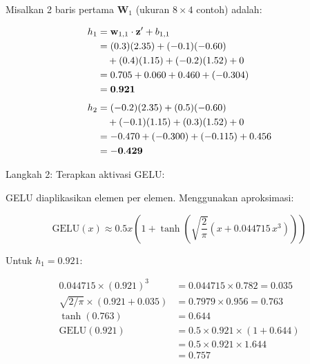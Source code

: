 \vspace{0.5cm}
\noindent
Misalkan 2 baris pertama $\mathbf{W}_1$ (ukuran $8\times4$ contoh) adalah:
 
\vspace{0.5cm}
\begin{align*}
  h_1
  &= \mathbf{w}_{1,1} \cdot \mathbf{z}' + b_{1,1} \notag \\
  &= (0.3)(2.35) + (-0.1)(-0.60) \notag \\
  &\quad + (0.4)(1.15) + (-0.2)(1.52) + 0 \notag \\
  &= 0.705 + 0.060 + 0.460 + (-0.304) \notag \\
  &= \mathbf{0.921} \\[4pt]
  h_2
  &= (-0.2)(2.35) + (0.5)(-0.60) \notag \\
  &\quad + (-0.1)(1.15) + (0.3)(1.52) + 0 \notag \\
  &= -0.470 + (-0.300) + (-0.115) + 0.456 \notag \\
  &= \mathbf{-0.429}
\end{align*}
\vspace{0.5cm}
 
\noindent Langkah 2: Terapkan aktivasi GELU:
 
\vspace{0.5cm}
\noindent
GELU diaplikasikan elemen per elemen. Menggunakan aproksimasi:

\begin{equation*}
  \mathrm{GELU}(x) \approx 0.5x
  \left(
    1 + \tanh\!\left(
      \sqrt{\frac{2}{\pi}}
      \left(x + 0.044715\,x^3\right)
    \right)
  \right)
\end{equation*}
 
\vspace{0.5cm}

\noindent Untuk $h_1 = 0.921$:\par
\begin{equation*}
\begin{aligned}
  0.044715 \times (0.921)^3
    &= 0.044715 \times 0.782 = 0.035 \\
  \sqrt{2/\pi} \times (0.921 + 0.035)
    &= 0.7979 \times 0.956 = 0.763 \\
  \tanh(0.763)
    &= 0.644 \\
  \mathrm{GELU}(0.921)
    &= 0.5 \times 0.921 \times (1 + 0.644) \\
    &= 0.5 \times 0.921 \times 1.644 \\
    &= \mathbf{0.757}
\end{aligned}
\end{equation*}

